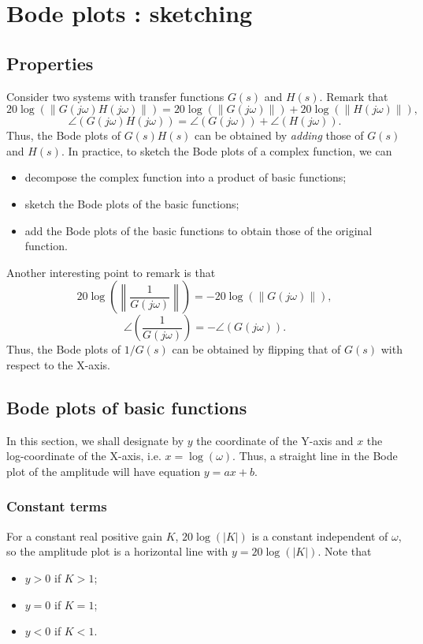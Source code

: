 \documentclass[a4paper,11pt]{report}
\theoremstyle{definition}
\begin{document}
\section{Bode plots : sketching}
\label{sec:bode-sketch}

\subsection{Properties}

Consider two systems with transfer functions $G(s)$ and $H(s)$. Remark
that
\[
20\log(\|G(j\omega)H(j\omega)\|) = 20\log(\|G(j\omega)\|) + 20 \log(\|H(j\omega)\|),
\]
\[
\angle(G(j\omega)H(j\omega)) = \angle(G(j\omega)) + \angle(H(j\omega)).
\]
Thus, the Bode plots of $G(s)H(s)$ can be obtained by \emph{adding}
those of $G(s)$ and $H(s)$. In practice, to sketch the Bode plots of a
complex function, we can
\begin{itemize}
\item decompose the complex function into a product of basic functions;
\item sketch the Bode plots of the basic functions;
\item add the Bode plots of the basic functions to obtain those of the
  original function.
\end{itemize}

Another interesting point to remark is that
\[
20\log\left(\left\|\frac{1}{G(j\omega)}\right\|\right) = -20\log(\|G(j\omega)\|),
\]
\[
\angle\left(\frac{1}{G(j\omega)}\right) = -\angle(G(j\omega)).
\]
Thus, the Bode plots of $1/G(s)$ can be obtained by flipping that of
$G(s)$ with respect to the X-axis.

\subsection{Bode plots of basic functions}

In this section, we shall designate by $y$ the coordinate of the
Y-axis and $x$ the log-coordinate of the X-axis,
i.e. $x=\log(\omega)$. Thus, a straight line in the Bode plot of the
amplitude will have equation $y=ax+b$.

\subsubsection{Constant terms}

For a constant real positive gain $K$, $20\log(|K|)$ is a constant
independent of $\omega$, so the amplitude plot is a horizontal line
with $y=20\log(|K|)$. Note that
\begin{itemize}
\item $y>0$ if $K>1$;
\item $y=0$ if $K=1$;
\item $y<0$ if $K<1$.
\end{itemize}
\end{document}
